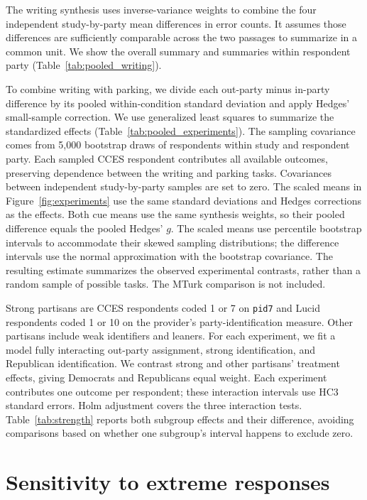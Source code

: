 \documentclass[12pt, letterpaper]{article}
\begin{document}
The writing synthesis uses inverse-variance weights to combine the four independent study-by-party mean differences in error counts. It assumes those differences are sufficiently comparable across the two passages to summarize in a common unit. We show the overall summary and summaries within respondent party (Table~\ref{tab:pooled_writing}).

To combine writing with parking, we divide each out-party minus in-party difference by its pooled within-condition standard deviation and apply Hedges' small-sample correction. We use generalized least squares to summarize the standardized effects (Table~\ref{tab:pooled_experiments}). The sampling covariance comes from 5,000 bootstrap draws of respondents within study and respondent party. Each sampled CCES respondent contributes all available outcomes, preserving dependence between the writing and parking tasks. Covariances between independent study-by-party samples are set to zero. The scaled means in Figure~\ref{fig:experiments} use the same standard deviations and Hedges corrections as the effects. Both cue means use the same synthesis weights, so their pooled difference equals the pooled Hedges' $g$. The scaled means use percentile bootstrap intervals to accommodate their skewed sampling distributions; the difference intervals use the normal approximation with the bootstrap covariance. The resulting estimate summarizes the observed experimental contrasts, rather than a random sample of possible tasks. The MTurk comparison is not included.

Strong partisans are CCES respondents coded 1 or 7 on \texttt{pid7} and Lucid respondents coded 1 or 10 on the provider's party-identification measure. Other partisans include weak identifiers and leaners. For each experiment, we fit a model fully interacting out-party assignment, strong identification, and Republican identification. We contrast strong and other partisans' treatment effects, giving Democrats and Republicans equal weight. Each experiment contributes one outcome per respondent; these interaction intervals use HC3 standard errors. Holm adjustment covers the three interaction tests. Table~\ref{tab:strength} reports both subgroup effects and their difference, avoiding comparisons based on whether one subgroup's interval happens to exclude zero.





\clearpage
\section{Sensitivity to extreme responses}
\end{document}
